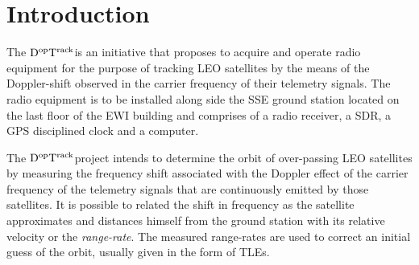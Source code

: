 \documentclass[11pt,a4paper,oneside]{article}
\newcommand{\GroundStationName}{${\rm D^{\rm op}T^{\rm rack}}$}
\begin{document}
\newcommand{\modellna}{SP-7000 LNA}
\newcommand{\modelradio}{AOR AR5001D}
\newcommand{\modelradioswitch}{AOR AS-5001DX}
\newcommand{\modelsdr}{USRP N210}
\newcommand{\modelsdrdb}{USRP BasicRX Daughterboard}
\newcommand{\modelsdrrack}{USRP U3 Rack Mount Kits}
\newcommand{\modelclock}{Spectracom Epsilon Clock EC20S}
\newcommand{\modelantennaVHF}{EB-144 M$^2$}
\newcommand{\modelantennaUHF}{EB-432 M$^2$}
\newcommand{\modelbiasT}{DCC 12/N}
\newcommand{\modellightprot}{N-FF-J01028B0045}
\newcommand{\modelsplitVUHF}{ZFSC-3-1WB-N+}
\newcommand{\modelsplitSband}{ZB3PD-63-N+}
\newcommand{\modelcomputer}{HP Compaq dc7800 Minitower}

\newcommand{\pricelna}{313.45}
\newcommand{\priceradio}{2,689.55}
\newcommand{\priceradioswitch}{83.19}
\newcommand{\pricesdr}{1,490.00}
\newcommand{\pricesdrdb}{66.00}
\newcommand{\pricesdrrack}{220.00}
\newcommand{\priceclock}{2,790.32}
\newcommand{\priceantennaVHF}{254.00}
\newcommand{\priceantennaUHF}{198.00 (!)}
\newcommand{\pricebiasT}{207.87}
\newcommand{\pricelightprot}{99.16}
\newcommand{\pricesplitVUHF}{131.29}
\newcommand{\pricesplitSband}{99.90}
\newcommand{\pricecomputer}{0}
\newcommand{\pricemisc}{500}
\newcommand{\pricetax}{1,747.98 (!)}
\newcommand{\pricedeliv}{136 (!)}
\newcommand{\priceassembly}{300 (?)}
\newcommand{\pricetotal}{10000 (!)}
\newcommand{\pricemaintenance}{1000/year}
\newcommand{\priceTA}{600(?)/year}



\section{Introduction}

The \GroundStationName is an initiative that proposes to acquire and operate radio equipment for the purpose of tracking \ac{LEO} satellites by the means of the Doppler-shift observed in the carrier frequency of their telemetry signals. The radio equipment is to be installed along side the \ac{SSE} ground station located on the last floor of the \ac{EWI} building and comprises of a radio receiver, a \ac{SDR}, a \ac{GPS} disciplined clock and a computer.

The \GroundStationName project intends to determine the orbit of over-passing \ac{LEO} satellites by measuring the frequency shift associated with the Doppler effect of the carrier frequency of the telemetry signals that are continuously emitted by those satellites. It is possible to related the shift in frequency as the satellite approximates and distances himself from the ground station with its relative velocity or the \emph{range-rate}. The measured range-rates are used to correct an initial guess of the orbit, usually given in the form of \acp{TLE}.
\end{document}

